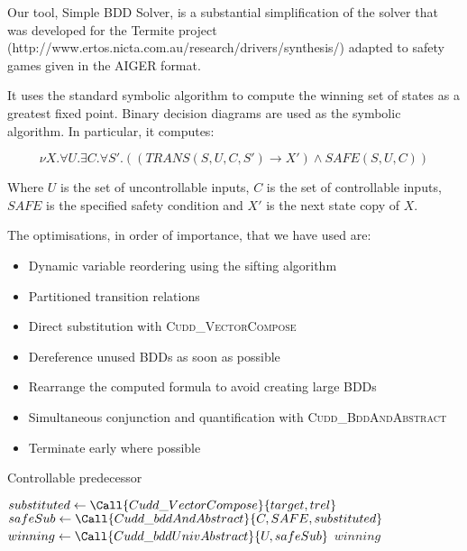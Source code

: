 Our tool, Simple BDD Solver, is a substantial simplification of the solver that was developed for the Termite project (http://www.ertos.nicta.com.au/research/drivers/synthesis/) adapted to safety games given in the AIGER format. 

It uses the standard symbolic algorithm to compute the winning set of states as a greatest fixed point. Binary decision diagrams are used as the symbolic algorithm. In particular, it computes:

\begin{equation}
\label{eqn:mu}
\nu X. \forall U. \exists C. \forall S'. ((TRANS(S, U, C, S') \rightarrow X') \wedge SAFE(S, U, C))
\end{equation}

Where $U$ is the set of uncontrollable inputs, $C$ is the set of controllable inputs, $SAFE$ is the specified safety condition and $X'$ is the next state copy of $X$.

The optimisations, in order of importance, that we have used are:
\begin{itemize}
    \item Dynamic variable reordering using the sifting algorithm
    \item Partitioned transition relations
    \item Direct substitution with \textsc{Cudd\_VectorCompose}
    \item Dereference unused BDDs as soon as possible
    \item Rearrange the computed formula to avoid creating large BDDs
    \item Simultaneous conjunction and quantification with \textsc{Cudd\_BddAndAbstract}
    \item Terminate early where possible
\end{itemize}

\begin{algorithm}
\caption{Controllable predecessor}
\label{alg:syntcomp_cpre}

\begin{algorithmic}

\State $substituted \gets \Call{Cudd\_VectorCompose}{target, trel}$
\State $safeSub     \gets \Call{Cudd\_bddAndAbstract}{C, SAFE, substituted}$
\State $winning     \gets \Call{Cudd\_bddUnivAbstract}{U, safeSub}$
\State \Return $winning$

\end{algorithmic}
\end{algorithm}

